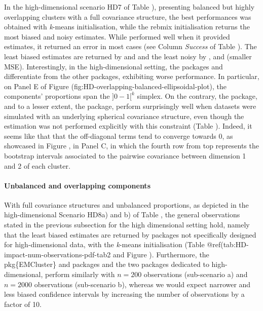 In the high-dimensional scenario HD7 of Table ), presenting balanced but highly overlapping clusters with a full covariance structure, the best performances was obtained with \emph{k}-means initialisation, while the rebmix initialisation returns the most biased and noisy estimates. While  performed well when it provided estimates, it returned an error in most cases (see Column \emph{Success} of Table ). The least biased estimates are returned by  and  and the least noisy by ,  and  (smaller MSE). Interestingly, in the high-dimensional setting, the packages  and  differentiate from the other packages, exhibiting worse performance. In particular, on Panel E of Figure (fig:HD-overlapping-balanced-ellipsoidal-plot), the components' proportions span the \(]0-1[^k\) simplex.
On the contrary, the  package, and to a lesser extent, the  package, perform surprisingly well when datasets were simulated with an underlying spherical covariance structure, even though the estimation was not performed explicitly with this constraint (Table 
). Indeed, it seems like that that the off-diagonal terms tend to converge towards 0, as showcased in Figure , in Panel C, in which the fourth row from top represents the bootstrap intervals associated to the pairwise covariance between dimension 1 and 2 of each cluster.

\paragraph{Unbalanced and overlapping components}

With full covariance structures and unbalanced proportions, as depicted in the high-dimensional Scenario HD8a) and b) of Table , the general observations stated in the previous subsection for the high dimensional setting hold, namely that the least biased estimates are returned by packages not specifically designed for high-dimensional data, with the \emph{k}-means initialisation (Table @ref(tab:HD-impact-num-observations-pdf-tab2 and Figure ). Furthermore, the pkg\{EMCluster\} and  packages and the two packages dedicated to high-dimensional, perform similarly with \(n=200\) observations (sub-scenario a) and \(n=2000\) observations (sub-scenario b), whereas we would expect narrower and less biased confidence intervals by increasing the number of observations by a factor of 10.

